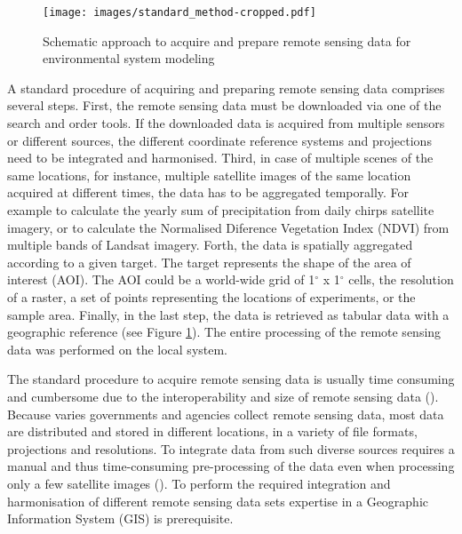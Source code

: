 \begin{center}
	\begin{figure}[h]
		\begin{center}
			\texttt{[image: images/standard\_method-cropped.pdf]}
			\caption{Schematic approach to acquire and prepare remote sensing data for environmental system modeling}
			\label{traditionl_approach}
		\end{center}
	\end{figure}
\end{center}


A standard procedure of acquiring and preparing remote sensing data comprises several steps. First, the remote sensing data must be downloaded via one of the search and order tools. If the downloaded data is acquired from multiple sensors or different sources, the different coordinate reference systems and projections need to be integrated and harmonised. Third, in case of multiple scenes of the same locations, for instance, multiple satellite images of the same location acquired at different times, the data has to be aggregated temporally. For example to calculate the yearly sum of precipitation from daily chirps satellite imagery, or to calculate the Normalised Diference Vegetation Index (NDVI) from multiple bands of Landsat imagery.
Forth, the data is spatially aggregated according to a given target. The target represents the shape of the area of interest (AOI). The AOI could be a world-wide grid of 1$^\circ$ x 1$^\circ$ cells, the resolution of a raster, a set of points representing the locations of experiments, or the sample area. Finally, in the last step, the data is retrieved as tabular data with a geographic reference (see Figure \ref{traditionl_approach}). The entire processing of the remote sensing data was performed on the local system.

The standard procedure to acquire remote sensing data is usually time consuming and cumbersome due to the interoperability and size of remote sensing data (\cite{iosifescu2011geovite}).
Because varies governments and agencies collect remote sensing data, most data are distributed and stored in different locations, in a variety of file formats, projections and resolutions. To integrate data from such diverse sources requires a manual and thus time-consuming pre-processing of the data even when processing only a few satellite images (\cite{schell2000geodata}). To perform the required integration and harmonisation of different remote sensing data sets expertise in a Geographic Information System (GIS) is prerequisite.

